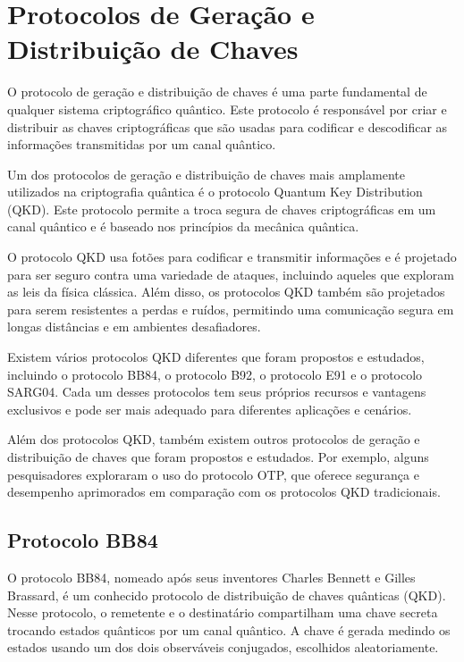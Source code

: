\section{Protocolos de Geração e Distribuição de Chaves}

O protocolo de geração e distribuição de chaves é uma parte fundamental de qualquer sistema criptográfico quântico. Este protocolo é responsável por criar e distribuir as chaves criptográficas que são usadas para codificar e descodificar as informações transmitidas por um canal quântico.

Um dos protocolos de geração e distribuição de chaves mais amplamente utilizados na criptografia quântica é o protocolo Quantum Key Distribution (QKD). Este protocolo permite a troca segura de chaves criptográficas em um canal quântico e é baseado nos princípios da mecânica quântica.

O protocolo QKD usa fotões para codificar e transmitir informações e é projetado para ser seguro contra uma variedade de ataques, incluindo aqueles que exploram as leis da física clássica. Além disso, os protocolos QKD também são projetados para serem resistentes a perdas e ruídos, permitindo uma comunicação segura em longas distâncias e em ambientes desafiadores.

Existem vários protocolos QKD diferentes que foram propostos e estudados, incluindo o protocolo BB84, o protocolo B92, o protocolo E91 e o protocolo SARG04. Cada um desses protocolos tem seus próprios recursos e vantagens exclusivos e pode ser mais adequado para diferentes aplicações e cenários.

Além dos protocolos QKD, também existem outros protocolos de geração e distribuição de chaves que foram propostos e estudados. Por exemplo, alguns pesquisadores exploraram o uso do protocolo OTP, que oferece segurança e desempenho aprimorados em comparação com os protocolos QKD tradicionais.

\subsection{Protocolo BB84}

O protocolo BB84, nomeado após seus inventores Charles Bennett e Gilles Brassard, é um conhecido protocolo de distribuição de chaves quânticas (QKD). Nesse protocolo, o remetente e o destinatário compartilham uma chave secreta trocando estados quânticos por um canal quântico. A chave é gerada medindo os estados usando um dos dois observáveis conjugados, escolhidos aleatoriamente.

